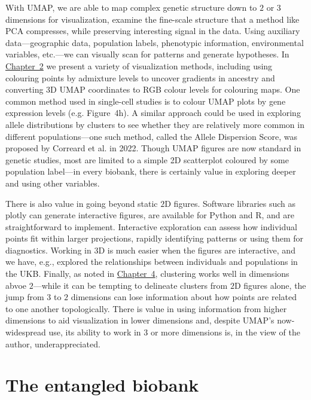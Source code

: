 With UMAP, we are able to map complex genetic structure down to $2$ or $3$ dimensions for visualization, examine the fine-scale structure that a method like PCA compresses, while preserving interesting signal in the data. Using auxiliary data---geographic data, population labels, phenotypic information, environmental variables, etc.---we can visually scan for patterns and generate hypotheses. In \hyperref[chap:chapter2]{Chapter~2} we present a variety of visualization methods, including using colouring points by admixture levels to uncover gradients in ancestry and converting 3D UMAP coordinates to RGB colour levels for colouring maps. One common method used in single-cell studies is to colour UMAP plots by gene expression levels (e.g. \citep{jessa_stalled_2019} Figure~4h). A similar approach could be used in exploring allele distributions by clusters to see whether they are relatively more common in different populations---one such method, called the Allele Dispersion Score, was proposed by Correard et al. in 2022\citep{correard_allele_2022}. Though UMAP figures are now standard in genetic studies, most are limited to a simple 2D scatterplot coloured by some population label---in every biobank, there is certainly value in exploring deeper and using other variables.

There is also value in going beyond static $2$D figures. Software libraries such as plotly\citep{plotly} can generate interactive figures, are available for Python and R, and are straightforward to implement. Interactive exploration can assess how individual points fit within larger projections, rapidly identifying patterns or using them for diagnostics. Working in $3$D is much easier when the figures are interactive, and we have, e.g., explored the relationships between individuals and populations in the UKB. Finally, as noted in \hyperref[chap:chapter4]{Chapter~4}, clustering works well in dimensions abvoe $2$---while it can be tempting to delineate clusters from $2$D figures alone, the jump from $3$ to $2$ dimensions can lose information about how points are related to one another topologically. There is value in using information from higher dimensions to aid visualization in lower dimensions and, despite UMAP's now-widespread use, its ability to work in $3$ or more dimensions is, in the view of the author, underappreciated.

\section{The entangled biobank}

